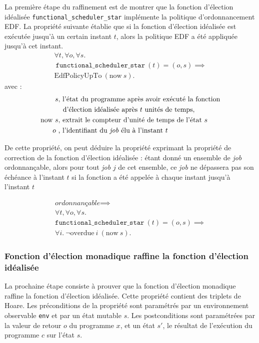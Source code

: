 	La première étape du raffinement est de montrer que la fonction d'élection idéalisée \texttt{functional\_scheduler\_star} implémente la politique d'ordonnancement EDF. La propriété suivante établie que si la fonction d'élection idéalisée est exécutée jusqu'à un certain instant $t$, alors la politique EDF a été appliquée jusqu'à cet instant.
	\begin{gather*}
		\forall t, \forall o, \forall s.\\ 
		~\texttt{functional\_scheduler\_star}~(t) = (o,s) \implies\\
		\text{EdfPolicyUpTo}~(\text{now}~s).
	\end{gather*}
\indent	avec :
	\begin{align*}
		s&\text{, l'état du programme après avoir exécuté la fonction}\\
		&~~\text{d'élection idéalisée après $t$ unités de temps},\\
		\text{now}~s&\text{, extrait le compteur d'unité de temps de l'état $s$}\\
		o~&\text{, l'identifiant du \emph{job} élu à l'instant $t$}
	\end{align*}

	De cette propriété, on peut déduire la propriété exprimant la propriété de correction de la fonction d'élection idéalisée :
	étant donné un ensemble de \emph{job} ordonnançable, alors pour tout \emph{job} $j$ de cet ensemble, ce \emph{job} ne dépassera pas son échéance à l'instant $t$ si la fonction a été appelée à chaque instant jusqu'à l'instant $t$

	\begin{gather*}
		\textit{ordonnançable} \implies\\
		\forall t, \forall o, \forall s.\\
		\texttt{functional\_scheduler\_star}~(t) = (o,s) \implies\\
		\forall i.~\neg \text{overdue}~i~(\text{now}~s).
	\end{gather*}

	\subsubsection{Fonction d'élection monadique raffine la fonction d'élection idéalisée}
	\label{sec:monadic}

	La prochaine étape consiste à prouver que la fonction d'élection monadique raffine la fonction d'élection idéalisée. Cette propriété contient des triplets de Hoare. 
	Les préconditions de la propriété sont paramétrés par un environnement observable \texttt{env} et par un état mutable $s$. Les postconditions sont paramétrées par la valeur de retour $o$ du programme $x$, et un état $s'$, le résultat de l'exécution du programme $c$ sur l'état $s$.

